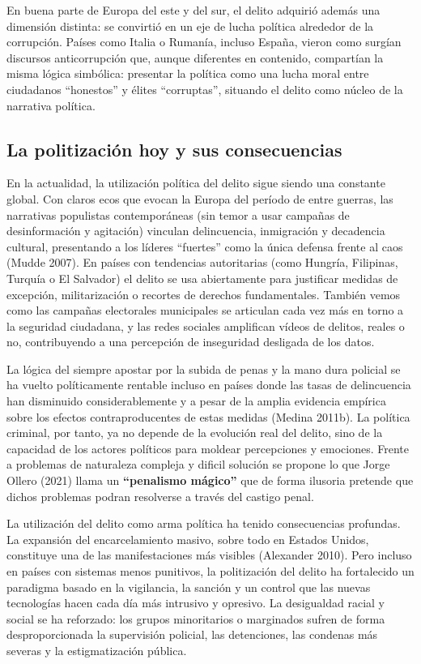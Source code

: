 \documentclass[
  spanish,
  letterpaper,
  DIV=11,
  numbers=noendperiod]{scrreprt}
\begin{document}
En buena parte de Europa del este y del sur, el delito adquirió además
una dimensión distinta: se convirtió en un eje de lucha política
alrededor de la corrupción. Países como Italia o Rumanía, incluso
España, vieron como surgían discursos anticorrupción que, aunque
diferentes en contenido, compartían la misma lógica simbólica: presentar
la política como una lucha moral entre ciudadanos ``honestos'' y élites
``corruptas'', situando el delito como núcleo de la narrativa política.

\subsection{La politización hoy y sus
consecuencias}\label{la-politizaciuxf3n-hoy-y-sus-consecuencias}

En la actualidad, la utilización política del delito sigue siendo una
constante global. Con claros ecos que evocan la Europa del período de
entre guerras, las narrativas populistas contemporáneas (sin temor a
usar campañas de desinformación y agitación) vinculan delincuencia,
inmigración y decadencia cultural, presentando a los líderes ``fuertes''
como la única defensa frente al caos (Mudde 2007). En países con
tendencias autoritarias (como Hungría, Filipinas, Turquía o El Salvador)
el delito se usa abiertamente para justificar medidas de excepción,
militarización o recortes de derechos fundamentales. También vemos como
las campañas electorales municipales se articulan cada vez más en torno
a la seguridad ciudadana, y las redes sociales amplifican vídeos de
delitos, reales o no, contribuyendo a una percepción de inseguridad
desligada de los datos.

La lógica del siempre apostar por la subida de penas y la mano dura
policial se ha vuelto políticamente rentable incluso en países donde las
tasas de delincuencia han disminuido considerablemente y a pesar de la
amplia evidencia empírica sobre los efectos contraproducentes de estas
medidas (Medina 2011b). La política criminal, por tanto, ya no depende
de la evolución real del delito, sino de la capacidad de los actores
políticos para moldear percepciones y emociones. Frente a problemas de
naturaleza compleja y dificil solución se propone lo que Jorge Ollero
(2021) llama un \textbf{``penalismo mágico''} que de forma ilusoria
pretende que dichos problemas podran resolverse a través del castigo
penal.

La utilización del delito como arma política ha tenido consecuencias
profundas. La expansión del encarcelamiento masivo, sobre todo en
Estados Unidos, constituye una de las manifestaciones más visibles
(Alexander 2010). Pero incluso en países con sistemas menos punitivos,
la politización del delito ha fortalecido un paradigma basado en la
vigilancia, la sanción y un control que las nuevas tecnologías hacen
cada día más intrusivo y opresivo. La desigualdad racial y social se ha
reforzado: los grupos minoritarios o marginados sufren de forma
desproporcionada la supervisión policial, las detenciones, las condenas
más severas y la estigmatización pública.
\end{document}
